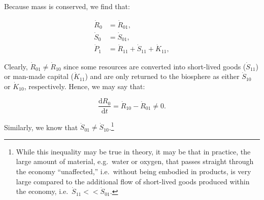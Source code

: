 Because mass is conserved, we find that:

\begin{align} 
\label{eq:A_R0}
	\dot{R}_{0}				&
	= \dot{R}_{01},			\\
\label{eq:A_S0}
	\dot{S}_{0}				&
	= \dot{S}_{01},			\\
\label{eq:A_P1}
	\dot{P}_{1} 			&
	= \dot{R}_{11} 
	+ \dot{S}_{11}
	+ \dot{K}_{11},	
\end{align}



Clearly, $\dot{R}_{01} \neq \dot{R}_{10}$ 
since some resources are converted into
short-lived goods ($\dot{S}_{11}$) or man-made capital ($\dot{K}_{11}$)
and are only returned to the biosphere as either
$\dot{S}_{10}$ or $\dot{K}_{10}$, respectively. 
Hence,
we may say that:

\begin{equation}\label{eq:A_dR0_neq_0}
	\frac{\mathrm{d}R_0}{\mathrm{d}t}
	= \dot{R}_{10}
	- \dot{R}_{01}
	\neq 0.
\end{equation}

Similarly, we know that
$\dot{S}_{01} \neq \dot{S}_{10}$.\footnote{While
this inequality may be true in theory,
it may be that in practice,
the large amount of material,
e.g.\ water or oxygen,
that passes straight through the economy ``unaffected,''
i.e.\ without being embodied in products,
is very large compared to the additional flow of short-lived goods
produced within the economy,
i.e.\ $\dot{S}_{11} << \dot{S}_{01}$.
}
%


